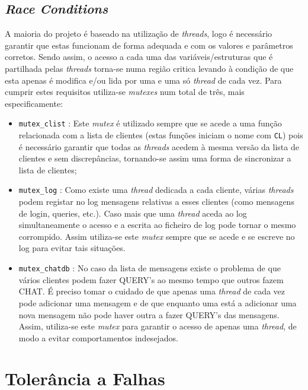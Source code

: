 \documentclass[a4paper]{article}
\begin{document}
	\subsection{\textit{Race Conditions}}

	A maioria do projeto é baseado na utilização de \textit{threads}, logo é necessário garantir que estas funcionam de forma adequada e com os valores e parâmetros corretos. Sendo assim, o acesso a cada uma das variáveis/estruturas que é partilhada pelas \textit{threads} torna-se numa região critica levando à condição de que esta apenas é modifica e/ou lida por uma e uma só \textit{thread} de cada vez. Para cumprir estes requisitos utiliza-se \textit{mutexes} num total de três, mais especificamente: 

	\begin{itemize}
		\item \texttt{mutex\_clist} : Este \textit{mutex} é utilizado sempre que se acede a uma função relacionada com a lista de clientes (estas funções iniciam o nome com \texttt{CL}) pois é necessário garantir que todas as \textit{threads} acedem à mesma versão da lista de clientes e sem discrepâncias, tornando-se assim uma forma de sincronizar a lista de clientes;  
		\item \texttt{mutex\_log} : Como existe uma \textit{thread} dedicada a cada cliente, várias \textit{threads} podem registar no log mensagens relativas a esses clientes (como mensagens de login, queries, etc.). Caso mais que uma \textit{thread} aceda ao log simultaneamente o acesso e a escrita ao ficheiro de log pode tornar o mesmo corrompido. Assim utiliza-se este \textit{mutex} sempre que se acede e se escreve no log para evitar tais situações. 
		\item \texttt{mutex\_chatdb} : No caso da lista de mensagens existe o problema de que vários clientes podem fazer QUERY's ao mesmo tempo que outros fazem CHAT. É preciso tomar o cuidado de que apenas uma \textit{thread} de cada vez pode adicionar uma mensagem e de que enquanto uma está a adicionar uma nova mensagem não pode haver outra a fazer QUERY's das mensagens. Assim, utiliza-se este \textit{mutex} para garantir o acesso de apenas uma \textit{thread}, de modo a evitar comportamentos indesejados.
	\end{itemize}




	\section{Tolerância a Falhas}
\end{document}
